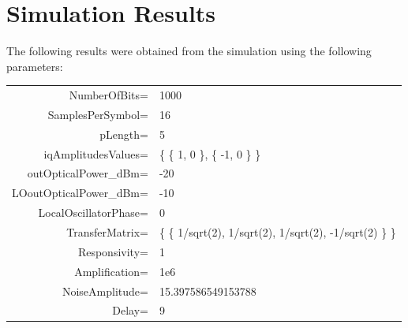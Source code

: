 \documentclass[a4paper]{article}
\begin{document}
\section{Simulation Results}

The following results were obtained from the simulation using the following parameters:
\begin{table}[H]
\centering
\begin{tabular}{rl}
NumberOfBits=          & 1000                                                \\
SamplesPerSymbol=      & 16                                                  \\
pLength=               & 5                                                   \\
iqAmplitudesValues=    & \{ \{ 1, 0 \}, \{ -1, 0 \} \}                             \\
outOpticalPower\_dBm=   & -20                                                 \\
LOoutOpticalPower\_dBm= & -10                                                 \\
LocalOscillatorPhase=  & 0                                                   \\
TransferMatrix=        & \{ \{ 1/sqrt(2), 1/sqrt(2), 1/sqrt(2), -1/sqrt(2) \} \} \\
Responsivity=          & 1                                                   \\
Amplification=         & 1e6                                                 \\
NoiseAmplitude=        & 15.397586549153788                                  \\
Delay=                 & 9                                                   \\
\end{tabular}
\end{table}
\end{document}
